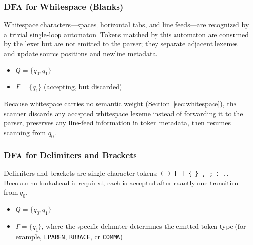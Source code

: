 \documentclass[11pt,a4paper]{article}
\newcommand{\token}[1]{\texttt{#1}}
\newcommand{\codeinline}[1]{\texttt{#1}}
\begin{document}
\subsubsection{DFA for Whitespace (Blanks)}\label{sec:whitespace-dfa}

Whitespace characters---spaces, horizontal tabs, and line feeds---are recognized by a trivial single-loop automaton. Tokens matched by this automaton are consumed by the lexer but are not emitted to the parser; they separate adjacent lexemes and update source positions and newline metadata.

\begin{itemize}
  \item $Q=\{q_0,q_1\}$
  \item $F=\{q_1\}$ (accepting, but discarded)
\end{itemize}

\begin{center}
\end{center}

Because whitespace carries no semantic weight (Section~\ref{sec:whitespace}), the scanner discards any accepted whitespace lexeme instead of forwarding it to the parser, preserves any line-feed information in token metadata, then resumes scanning from $q_0$.

\subsubsection{DFA for Delimiters and Brackets}

Delimiters and brackets are single-character tokens: \codeinline{( ) [ ] \{ \} , ; : .}. Because no lookahead is required, each is accepted after exactly one transition from $q_0$.

\begin{itemize}
  \item $Q=\{q_0,q_1\}$
  \item $F=\{q_1\}$, where the specific delimiter determines the emitted token type (for example, \token{LPAREN}, \token{RBRACE}, or \token{COMMA})
\end{itemize}
\end{document}
